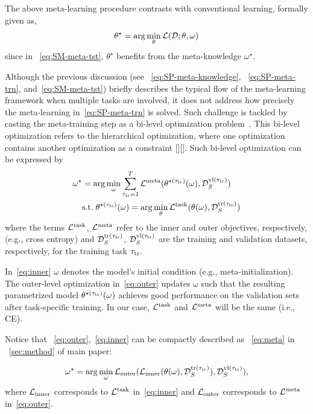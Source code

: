 The above meta-learning procedure contrasts with conventional learning, formally given as,
\begin{equation}
    \theta^{\star} = \arg\min_{\theta}{\cal L}({\cal D};\theta, \omega)\label{eq:SP-conventional}
\end{equation}
since in ~\cref{eq:SM-meta-tst}, $\theta^{{\star}}$ benefits from the meta-knowledge $\omega^{\star}$. 

Although the previous discussion (see ~\cref{eq:SP-meta-knowledge}, ~\cref{eq:SP-meta-trn}, and~\cref{eq:SM-meta-tst}) briefly describes the typical flow of the meta-learning framework when multiple tasks are involved, it does not address how precisely the meta-learning in~\cref{eq:SP-meta-trn} is solved. Such challenge is tackled by casting the meta-training step as a bi-level optimization problem~\cite{stackelberg1952theory}. This bi-level optimization refers to the  hierarchical optimization, where one optimization contains another optimization as a constraint [][]. 
Such bi-level optimization can be expressed by   
\begin{align}
    \omega^{\star} &= \arg\min_{\omega} \sum_{\tau_{\rm tr} = 1}^{T} {\cal L}^{\rm meta} (\theta^{\star (\tau_{\rm tr})}(\omega), {\cal D}_{S}^{{\rm vl}{(\tau_{\rm tr})}  }) \label{eq:outer} \\
    &{\rm s.t.}\;  \theta^{\star (\tau_{\rm tr})}(\omega) = \arg\min_{\theta} {\cal L}^{\rm task}(\theta(\omega), {\cal D}_{S}^{{\rm tr}  (\tau_{\rm tr})} ) \label{eq:inner}
\end{align}
where the terms ${\cal L}^{\rm task}$, ${\cal L}^{\rm meta}$ refer to the inner and outer objectives, respectively, (e.g., cross entropy) and 
${\cal D}_{S}^{\rm tr(\tau_{\rm tr})}$,
${\cal D}_{S}^{\rm vl(\tau_{\rm tr})}$ are the training and validation datasets, respectively, for the training task $\tau_{\rm tr}$.

In~\cref{eq:inner} $\omega$ denotes the model's initial condition (e.g., meta-initialization). 
The outer-level optimization in~\cref{eq:outer} updates $\omega$ such that the resulting  parametrized model  $\theta^{\star (\tau_{\rm tr})}(\omega)$ achieves good performance on the validation sets after task-specific training. 
In our case, ${\cal L}^{\rm task}$ and ${\cal L}^{\rm meta}$ will be the same (i.e., CE). 

Notice that ~\cref{eq:outer},~\cref{eq:inner} can be compactly described as ~\cref{eq:meta} in ~\cref{sec:method} of main paper:

\begin{equation}
    \omega^{{\star}} = \arg\min_{\omega} {\cal L}_{\rm outer} ({\cal L}_{\rm inner} (\theta(\omega), \mathcal{D}^{{\rm tr}(\tau_{\rm tr})}_{S}),\mathcal{D}^{{\rm vl}(\tau_{\rm tr})}_{S}),\label{eq:sp_meta}
\end{equation}
where  ${\cal L}_{\rm inner}$ corresponds to ${\cal L}^{\rm task}$ in~\cref{eq:inner} and ${\cal L}_{\rm outer}$ corresponds to ${\cal L}^{\rm meta}$ in~\cref{eq:outer}.

